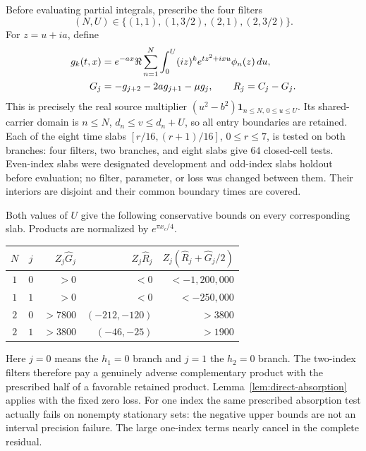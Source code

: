 \documentclass[11pt]{article}
\numberwithin{equation}{section}
\theoremstyle{definition}
\theoremstyle{remark}
\newcommand{\dd}{\,d}
\begin{document}
Before evaluating partial integrals, prescribe the four filters
\[
 (N,U)\in\{(1,1),(1,3/2),(2,1),(2,3/2)\}.
\]
For $z=u+ia$, define
\begin{align}
 g_k(t,x)&=e^{-ax}\Re\sum_{n=1}^N\int_0^U
             (iz)^k e^{tz^2+ixu}\phi_n(z)\dd u,\notag\\
 G_j&=-g_{j+2}-2ag_{j+1}-\mu g_j,\qquad R_j=C_j-G_j.
 \label{eq:rectangular-filter}
\end{align}
This is precisely the real source multiplier
$(u^2-b^2)\mathbf1_{n\le N,\,0\le u\le U}$. Its shared-carrier
domain is $n\le N$, $d_n\le v\le d_n+U$, so all entry boundaries
are retained. Each of the eight time slabs
$[r/16,(r+1)/16]$, $0\le r\le7$, is tested on both branches:
four filters, two branches, and eight slabs give $64$ closed-cell tests.
Even-index slabs were designated development and odd-index slabs holdout
before evaluation; no filter, parameter, or loss was changed between them.
Their interiors are disjoint and their common boundary times are covered.

Both values of $U$ give the following conservative bounds on every
corresponding slab. Products are normalized by $e^{\pi x_c/4}$.
\begin{center}
\begin{tabular}{@{}ccrrr@{}}
\toprule
$N$ & $j$ & $Z_j\widehat G_j$ & $Z_j\widehat R_j$
    & $Z_j(\widehat R_j+\widehat G_j/2)$\\
\midrule
$1$ & $0$ & $>0$ & $<0$ & $<-1{,}200{,}000$\\
$1$ & $1$ & $>0$ & $<0$ & $<-250{,}000$\\
$2$ & $0$ & $>7800$ & $(-212,-120)$ & $>3800$\\
$2$ & $1$ & $>3800$ & $(-46,-25)$ & $>1900$\\
\bottomrule
\end{tabular}
\end{center}
Here $j=0$ means the $h_1=0$ branch and $j=1$ the $h_2=0$ branch.
The two-index filters therefore pay a genuinely adverse complementary
product with the prescribed half of a favorable retained product.
Lemma~\ref{lem:direct-absorption} applies with the fixed zero loss.
For one index the same prescribed absorption test actually fails on
nonempty stationary sets: the negative upper bounds are not an interval
precision failure. The large one-index terms nearly cancel in the
complete residual.
\end{document}
